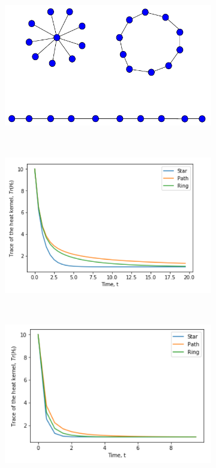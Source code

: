 \documentclass[12pt]{article}
\begin{document}
\begin{figure}[H]
	\centering
	\begin{subfigure}[b]{0.45\textwidth}
		\includegraphics[width= \textwidth]{images/kernel-graphs.pdf}
		\caption{}
		\label{kernelgraphs}
	\end{subfigure}~
	\begin{subfigure}[b]{0.45\textwidth}
		\includegraphics[width= \textwidth]{images/Trace-kernel-plot}
		\caption{}
		\label{plot-kernel}
	\end{subfigure}\\
	\begin{subfigure}[b]{0.45\textwidth}
		\includegraphics[width= \textwidth]{images/mellin-s-2.png}

\end{subfigure}
\end{figure}
\end{document}
